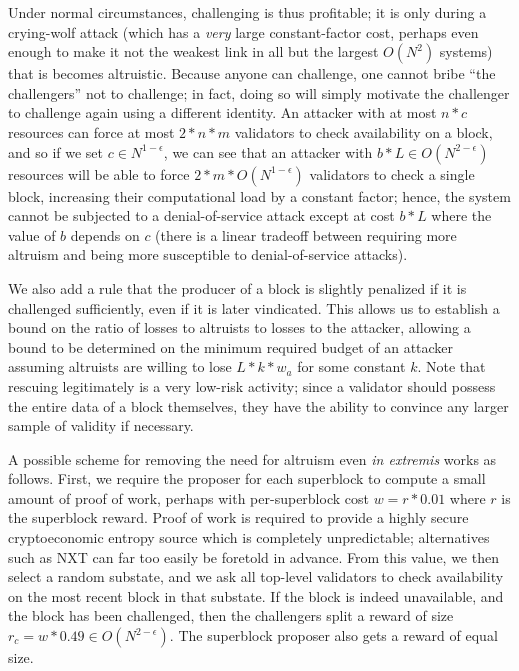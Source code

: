 \documentclass[11pt,a4paper]{report}
\theoremstyle{plain}
\theoremstyle{definition}
\theoremstyle{remark}
\begin{document}
Under normal circumstances, challenging is thus profitable; it is only during a crying-wolf attack (which has a \emph{very} large constant-factor cost, perhaps even enough to make it not the weakest link in all but the largest $O(N^2)$ systems) that is becomes altruistic. Because anyone can challenge, one cannot bribe ``the challengers'' not to challenge; in fact, doing so will simply motivate the challenger to challenge again using a different identity. An attacker with at most $n * c$ resources can force at most $2 * n * m$ validators to check availability on a block, and so if we set $c \in N^{1-\epsilon}$, we can see that an attacker with $b * L \in O(N^{2-\epsilon})$ resources will be able to force $2 * m * O(N^{1-\epsilon})$ validators to check a single block, increasing their computational load by a constant factor; hence, the system cannot be subjected to a denial-of-service attack except at cost $b * L$ where the value of $b$ depends on $c$ (there is a linear tradeoff between requiring more altruism and being more susceptible to denial-of-service attacks).

We also add a rule that the producer of a block is slightly penalized if it is challenged sufficiently, even if it is later vindicated. This allows us to establish a bound on the ratio of losses to altruists to losses to the attacker, allowing a bound to be determined on the minimum required budget of an attacker assuming altruists are willing to lose $L * k * w_a$ for some constant $k$. Note that rescuing legitimately is a very low-risk activity; since a validator should possess the entire data of a block themselves, they have the ability to convince any larger sample of validity if necessary.

A possible scheme for removing the need for altruism even \emph{in extremis} works as follows. First, we require the proposer for each superblock to compute a small amount of proof of work, perhaps with per-superblock cost $w = r * 0.01$ where $r$ is the superblock reward. Proof of work is required to provide a highly secure cryptoeconomic entropy source which is completely unpredictable; alternatives such as NXT can far too easily be foretold in advance. From this value, we then select a random substate, and we ask all top-level validators to check availability on the most recent block in that substate. If the block is indeed unavailable, and the block has been challenged, then the challengers split a reward of size $r_c = w * 0.49 \in O(N^{2-\epsilon})$. The superblock proposer also gets a reward of equal size.
\end{document}
